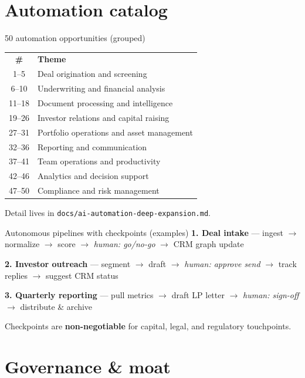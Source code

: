 \documentclass[aspectratio=169,11pt]{beamer}
\begin{document}
\section{Automation catalog}

\begin{frame}{50 automation opportunities (grouped)}
  \tiny
  \begin{tabular}{cl}
    \textbf{\#} & \textbf{Theme} \\
    1--5   & Deal origination and screening \\
    6--10  & Underwriting and financial analysis \\
    11--18 & Document processing and intelligence \\
    19--26 & Investor relations and capital raising \\
    27--31 & Portfolio operations and asset management \\
    32--36 & Reporting and communication \\
    37--41 & Team operations and productivity \\
    42--46 & Analytics and decision support \\
    47--50 & Compliance and risk management \\
  \end{tabular}
  \vspace{0.5em}

  \normalsize Detail lives in \texttt{docs/ai-automation-deep-expansion.md}.
\end{frame}

\begin{frame}{Autonomous pipelines with checkpoints (examples)}
  \small
  \textbf{1. Deal intake} --- ingest $\rightarrow$ normalize $\rightarrow$ score $\rightarrow$ \textit{human: go/no-go} $\rightarrow$ CRM graph update

  \textbf{2. Investor outreach} --- segment $\rightarrow$ draft $\rightarrow$ \textit{human: approve send} $\rightarrow$ track replies $\rightarrow$ suggest CRM status

  \textbf{3. Quarterly reporting} --- pull metrics $\rightarrow$ draft LP letter $\rightarrow$ \textit{human: sign-off} $\rightarrow$ distribute \& archive

  \vspace{0.5em}
  Checkpoints are \textbf{non-negotiable} for capital, legal, and regulatory touchpoints.
\end{frame}

\section{Governance \& moat}
\end{document}
